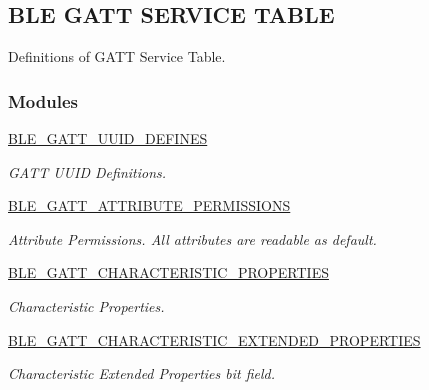 \hypertarget{group___b_l_e___g_a_t_t___s_e_r_v_i_c_e___t_a_b_l_e}{}\subsection{B\+LE G\+A\+TT S\+E\+R\+V\+I\+CE T\+A\+B\+LE}
\label{group___b_l_e___g_a_t_t___s_e_r_v_i_c_e___t_a_b_l_e}


Definitions of G\+A\+TT Service Table.  


\subsubsection*{Modules}
\begin{DoxyCompactItemize}
\item 
\hyperlink{group___b_l_e___g_a_t_t___u_u_i_d___d_e_f_i_n_e_s}{B\+L\+E\+\_\+\+G\+A\+T\+T\+\_\+\+U\+U\+I\+D\+\_\+\+D\+E\+F\+I\+N\+ES}
\begin{DoxyCompactList}\small\item\em G\+A\+TT U\+U\+ID Definitions. \end{DoxyCompactList}\item 
\hyperlink{group___b_l_e___g_a_t_t___a_t_t_r_i_b_u_t_e___p_e_r_m_i_s_s_i_o_n_s}{B\+L\+E\+\_\+\+G\+A\+T\+T\+\_\+\+A\+T\+T\+R\+I\+B\+U\+T\+E\+\_\+\+P\+E\+R\+M\+I\+S\+S\+I\+O\+NS}
\begin{DoxyCompactList}\small\item\em Attribute Permissions. All attributes are readable as default. \end{DoxyCompactList}\item 
\hyperlink{group___b_l_e___g_a_t_t___c_h_a_r_a_c_t_e_r_i_s_t_i_c___p_r_o_p_e_r_t_i_e_s}{B\+L\+E\+\_\+\+G\+A\+T\+T\+\_\+\+C\+H\+A\+R\+A\+C\+T\+E\+R\+I\+S\+T\+I\+C\+\_\+\+P\+R\+O\+P\+E\+R\+T\+I\+ES}
\begin{DoxyCompactList}\small\item\em Characteristic Properties. \end{DoxyCompactList}\item 
\hyperlink{group___b_l_e___g_a_t_t___c_h_a_r_a_c_t_e_r_i_s_t_i_c___e_x_t_e_n_d_e_d___p_r_o_p_e_r_t_i_e_s}{B\+L\+E\+\_\+\+G\+A\+T\+T\+\_\+\+C\+H\+A\+R\+A\+C\+T\+E\+R\+I\+S\+T\+I\+C\+\_\+\+E\+X\+T\+E\+N\+D\+E\+D\+\_\+\+P\+R\+O\+P\+E\+R\+T\+I\+ES}
\begin{DoxyCompactList}\small\item\em Characteristic Extended Properties bit field. \end{DoxyCompactList}\item 

\end{DoxyCompactItemize}

